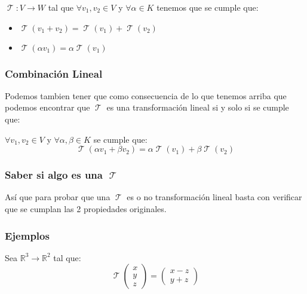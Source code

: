 \documentclass[12pt]{report}                                %
\DeclareMathOperator \LinealTransformation {\mathcal{T}}
\begin{document}
        $\LinealTransformation: V \to W $ tal que $\forall v_1, v_2 \in V $ y $\forall \alpha \in K$
        tenemos que se cumple que:

        \begin{itemize}
            \item $\LinealTransformation (v_1 + v_2) = \LinealTransformation(v_1) + \LinealTransformation(v_2)$
            \item $\LinealTransformation (\alpha v_1) = \alpha \LinealTransformation(v_1)$ 
        \end{itemize}

        \subsubsection{Combinación Lineal}
        Podemos tambien tener que como consecuencia de lo que tenemos arriba que podemos
        encontrar que $\LinealTransformation$ es una transformación lineal si y solo si se cumple que:

        $\forall v_1, v_2 \in V$ y $\forall \alpha, \beta \in K$ se cumple que:
        \begin{equation}
            \LinealTransformation(\alpha v_1 + \beta v_2) = \alpha \LinealTransformation(v_1) + \beta \LinealTransformation(v_2)
        \end{equation}

        \subsubsection{Saber si algo es una $\LinealTransformation$}
        Así que para probar que una $\LinealTransformation$ es o no transformación lineal basta con verificar
        que se cumplan las 2 propiedades originales. 

        \clearpage
        \subsubsection{Ejemplos}
            Sea $\mathbb{R}^3 \to \mathbb{R}^2$ tal que:
            \begin{equation*}
                \LinealTransformation\left( \begin{matrix} x\\y\\z \end{matrix} \right) =
                \left( \begin{matrix} x-z\\y+z \end{matrix} \right)
            \end{equation*}
\end{document}
